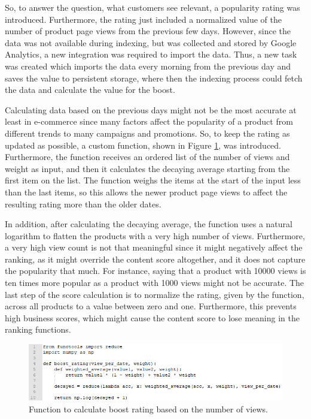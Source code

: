 So, to answer the question, what customers see relevant, a popularity rating was introduced. 
Furthermore, the rating just included a normalized value of the number of product page views from the previous few days.
However, since the data was not available during indexing, but was collected and stored by Google Analytics,
a new integration was required to import the data.
Thus, a new task was created which imports the data every morning from the previous day and saves the value
to persistent storage, where then the indexing process could fetch the data and calculate the value for the boost.


Calculating data based on the previous days might not be the most accurate at least in e-commerce since 
many factors affect the popularity of a product from different trends to many campaigns and promotions.
So, to keep the rating as updated as possible, a custom function, shown in Figure \ref{fig:new-boost-rating}, was introduced.
Furthermore, the function receives an ordered list of the number of views and weight as input, and then it
calculates the decaying average starting from the first item on the list.
The function weighs the items at the start of the input less than the last items, so this allows the newer 
product page views to affect the resulting rating more than the older dates.


In addition, after calculating the decaying average, the function uses a natural logarithm to flatten the products with
a very high number of views.
Furthermore, a very high view count is not that meaningful since it might negatively affect the ranking, as 
it might override the content score altogether, and it does not capture the popularity that much.
For instance, saying that a product with 10000 views is ten times more popular as a product with 1000 views might not be accurate.
The last step of the score calculation is to normalize the rating, given by the function, across all products
to a value between zero and one.
Furthermore, this prevents high business scores, which might cause the content score to lose meaning in 
the ranking functions.

\begin{figure}
    \centering
    \includegraphics[width=\textwidth]{img/new-boost-rating.png}
    \caption{Function to calculate boost rating based on the number of views.}
    \label{fig:new-boost-rating}
\end{figure}


